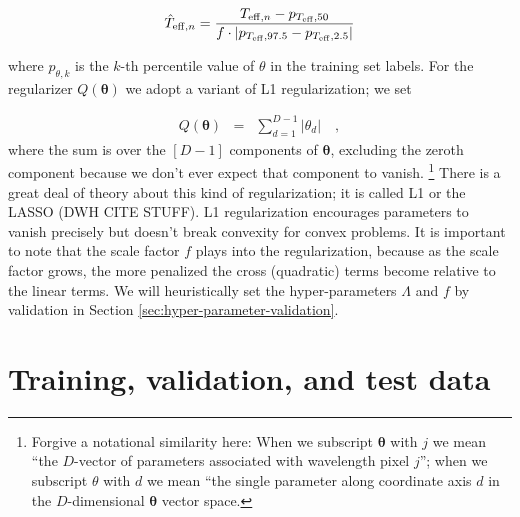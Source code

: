 \documentclass[12pt,preprint]{aastex}
\newcommand{\Teff}{T_{\mathrm{eff}}}
\newcommand{\Dvector}[1]{\boldsymbol{#1}}
\newcommand{\vectheta}{\Dvector{\theta}}
\begin{document}
\begin{eqnarray}\label{eq:label-norm}
  \hat{T}_{\mathrm{eff},n} = \frac{T_{{\rm eff},n} - p_{\Teff,50}}{f\cdot|p_{\Teff,97.5} - p_{\Teff,2.5}|}
\end{eqnarray}

\noindent{}where $p_{\theta,k}$ is the $k$-th percentile value of $\theta$ in
the training set labels. For the regularizer $Q(\vectheta)$ we adopt a variant
of L1 regularization; we set

\begin{eqnarray}\label{eq:l1-variant}
  Q(\vectheta) &=& \sum_{d=1}^{D-1} |\theta_d|
  \quad,
\end{eqnarray}
where the sum is over the $[D-1]$ components of $\vectheta$, excluding the 
zeroth component because we don't ever expect that component to vanish.
\footnote{Forgive a notational similarity here: When we subscript $\vectheta$ 
with $j$ we mean ``the $D$-vector of parameters associated with wavelength pixel
$j$''; when we subscript $\theta$ with $d$ we mean ``the single parameter along 
coordinate axis $d$ in the $D$-dimensional $\vectheta$ vector space.} There is
a great deal of theory about this kind of regularization; it is called L1 or the
LASSO (DWH CITE STUFF).  L1 regularization encourages parameters to vanish 
precisely but doesn't break convexity for convex problems.  It is important to
note that the scale factor $f$ plays into the regularization, because as the 
scale factor grows, the more penalized the cross (quadratic) terms become 
relative to the linear terms.  We will heuristically set the hyper-parameters
$\Lambda$ and $f$ by validation in Section \ref{sec:hyper-parameter-validation}.




\section{Training, validation, and test data}
\label{sec:training-set}
\end{document}
